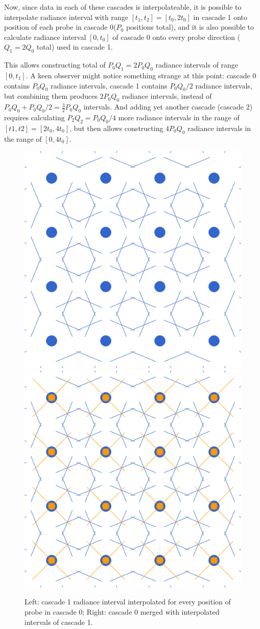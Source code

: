 \documentclass{jcgt}
\begin{document}
Now, since data in each of these cascades is interpolateable, it is possible to interpolate radiance interval with range $[t_1, t_2]=[t_0,2t_0]$ in cascade 1 onto position of each probe in cascade 0($P_0$ positions total), and
it is also possible to calculate radiance interval $[0,t_0]$ of cascade 0 onto every probe direction ($Q_1=2Q_0$ total) used in cascade 1.



This allows constructing total of $P_0Q_1=2P_0Q_0$ radiance intervals of range $[0,t_1]$. A keen observer might notice something strange at this point: cascade 0 contains $P_0Q_0$ radiance intervals,
cascade 1 contains $P_0Q_0/2$ radiance intervals, but combining them produces $2P_0Q_0$ radiance intervals, instead of $P_0Q_0+P_0Q_0/2=\frac{3}{2}P_0Q_0$ intervals. And adding yet another cascade (cascade 2) requires calculating
$P_2Q_2=P_0Q_0/4$ more radiance intervals in the range of $[t1,t2]=[2t_0,4t_0]$, but then allows constructing $4P_0Q_0$ radiance intervals in the range of $[0,4t_0]$.

\begin{figure}[htb]
  \centering
  \includegraphics[width=0.49\columnwidth]{images/cascade 1 on 0 exclusive.png}
  \includegraphics[width=0.49\columnwidth]{images/cascade 1 on 0 merged.png}
  \caption{\label{fig:cascades}
     Left: cascade 1 radiance interval interpolated for every position of probe in cascade 0; Right: cascade 0 merged with interpolated intervals of cascade 1.}
\end{figure}
\end{document}
